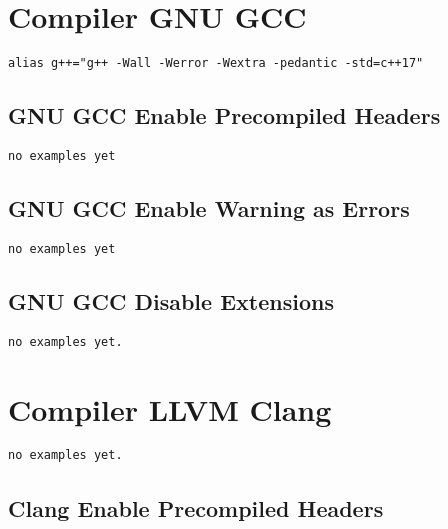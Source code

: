 \section{Compiler GNU GCC}

\begin{verbatim}
alias g++="g++ -Wall -Werror -Wextra -pedantic -std=c++17"
\end{verbatim}

\subsection{GNU GCC Enable Precompiled Headers}

\begin{verbatim}
no examples yet
\end{verbatim}

\subsection{GNU GCC Enable Warning as Errors}

\begin{verbatim}
no examples yet
\end{verbatim}

\subsection{GNU GCC Disable Extensions}

\begin{verbatim}
no examples yet.
\end{verbatim}

\section{Compiler LLVM Clang}

\begin{verbatim}
no examples yet.
\end{verbatim}

\subsection{Clang Enable Precompiled Headers}

